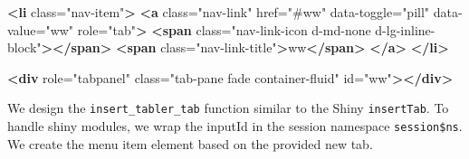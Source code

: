 \documentclass[
]{book}
\newenvironment{Shaded}{\begin{snugshade}}{\end{snugshade}}
\newcommand{\KeywordTok}[1]{\textcolor[rgb]{0.13,0.29,0.53}{\textbf{#1}}}
\newcommand{\NormalTok}[1]{#1}
\newcommand{\OtherTok}[1]{\textcolor[rgb]{0.56,0.35,0.01}{#1}}
\newcommand{\StringTok}[1]{\textcolor[rgb]{0.31,0.60,0.02}{#1}}
\begin{document}
\begin{Shaded}
\begin{Highlighting}[]
\KeywordTok{<li}\OtherTok{ class=}\StringTok{"nav-item"}\KeywordTok{>}
  \KeywordTok{<a}\OtherTok{ class=}\StringTok{"nav-link"}\OtherTok{ href=}\StringTok{"#ww"}\OtherTok{ data-toggle=}\StringTok{"pill"}\OtherTok{ data-value=}\StringTok{"ww"}\OtherTok{ role=}\StringTok{"tab"}\KeywordTok{>}
    \KeywordTok{<span}\OtherTok{ class=}\StringTok{"nav-link-icon d-md-none d-lg-inline-block"}\KeywordTok{></span>}
    \KeywordTok{<span}\OtherTok{ class=}\StringTok{"nav-link-title"}\KeywordTok{>}\NormalTok{ww}\KeywordTok{</span>}
  \KeywordTok{</a>}
\KeywordTok{</li>}

\KeywordTok{<div}\OtherTok{ role=}\StringTok{"tabpanel"}\OtherTok{ class=}\StringTok{"tab-pane fade container-fluid"}\OtherTok{ id=}\StringTok{"ww"}\KeywordTok{></div>}
\end{Highlighting}
\end{Shaded}

We design the \texttt{insert\_tabler\_tab} function similar to the Shiny \texttt{insertTab}.
To handle shiny modules, we wrap the inputId in the session namespace \texttt{session\$ns}. We create the menu item element based on the provided new tab.
\end{document}
